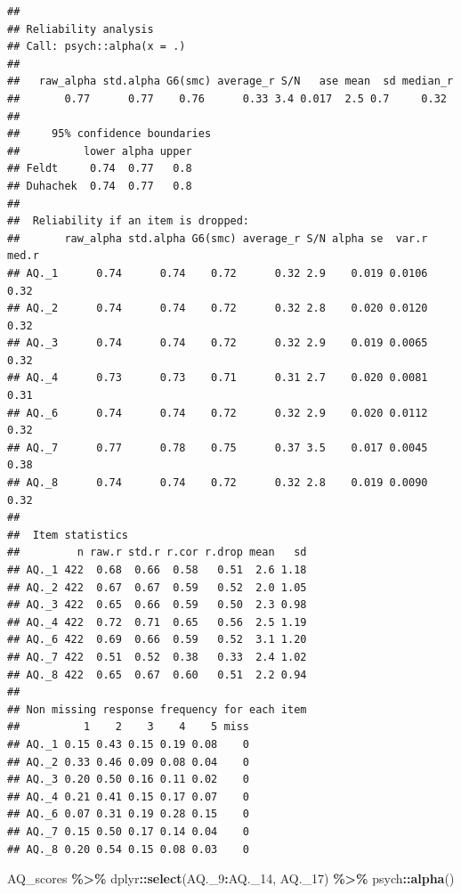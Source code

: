 \documentclass[
]{article}
\newenvironment{Shaded}{\begin{snugshade}}{\end{snugshade}}
\newcommand{\FunctionTok}[1]{\textcolor[rgb]{0.13,0.29,0.53}{\textbf{#1}}}
\newcommand{\NormalTok}[1]{#1}
\newcommand{\SpecialCharTok}[1]{\textcolor[rgb]{0.81,0.36,0.00}{\textbf{#1}}}
\begin{document}
\begin{verbatim}
## 
## Reliability analysis   
## Call: psych::alpha(x = .)
## 
##   raw_alpha std.alpha G6(smc) average_r S/N   ase mean  sd median_r
##       0.77      0.77    0.76      0.33 3.4 0.017  2.5 0.7     0.32
## 
##     95% confidence boundaries 
##          lower alpha upper
## Feldt     0.74  0.77   0.8
## Duhachek  0.74  0.77   0.8
## 
##  Reliability if an item is dropped:
##       raw_alpha std.alpha G6(smc) average_r S/N alpha se  var.r med.r
## AQ._1      0.74      0.74    0.72      0.32 2.9    0.019 0.0106  0.32
## AQ._2      0.74      0.74    0.72      0.32 2.8    0.020 0.0120  0.32
## AQ._3      0.74      0.74    0.72      0.32 2.9    0.019 0.0065  0.32
## AQ._4      0.73      0.73    0.71      0.31 2.7    0.020 0.0081  0.31
## AQ._6      0.74      0.74    0.72      0.32 2.9    0.020 0.0112  0.32
## AQ._7      0.77      0.78    0.75      0.37 3.5    0.017 0.0045  0.38
## AQ._8      0.74      0.74    0.72      0.32 2.8    0.019 0.0090  0.32
## 
##  Item statistics 
##         n raw.r std.r r.cor r.drop mean   sd
## AQ._1 422  0.68  0.66  0.58   0.51  2.6 1.18
## AQ._2 422  0.67  0.67  0.59   0.52  2.0 1.05
## AQ._3 422  0.65  0.66  0.59   0.50  2.3 0.98
## AQ._4 422  0.72  0.71  0.65   0.56  2.5 1.19
## AQ._6 422  0.69  0.66  0.59   0.52  3.1 1.20
## AQ._7 422  0.51  0.52  0.38   0.33  2.4 1.02
## AQ._8 422  0.65  0.67  0.60   0.51  2.2 0.94
## 
## Non missing response frequency for each item
##          1    2    3    4    5 miss
## AQ._1 0.15 0.43 0.15 0.19 0.08    0
## AQ._2 0.33 0.46 0.09 0.08 0.04    0
## AQ._3 0.20 0.50 0.16 0.11 0.02    0
## AQ._4 0.21 0.41 0.15 0.17 0.07    0
## AQ._6 0.07 0.31 0.19 0.28 0.15    0
## AQ._7 0.15 0.50 0.17 0.14 0.04    0
## AQ._8 0.20 0.54 0.15 0.08 0.03    0
\end{verbatim}

\begin{Shaded}
\begin{Highlighting}[]
\NormalTok{AQ\_scores }\SpecialCharTok{\%\textgreater{}\%}\NormalTok{ dplyr}\SpecialCharTok{::}\FunctionTok{select}\NormalTok{(AQ.\_9}\SpecialCharTok{:}\NormalTok{AQ.\_14, AQ.\_17) }\SpecialCharTok{\%\textgreater{}\%}\NormalTok{ psych}\SpecialCharTok{::}\FunctionTok{alpha}\NormalTok{()}
\end{Highlighting}
\end{Shaded}
\end{document}
